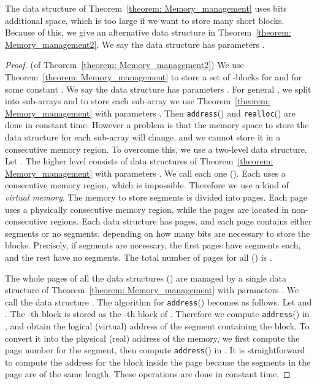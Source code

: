 \documentclass{llncs}
\begin{document}
The data structure of Theorem~\ref{theorem: Memory_management} uses
 bits additional space, which is too large if we want
to store many short blocks.
Because of this, we give an alternative data structure in
Theorem~\ref{theorem: Memory_management2}.
We say the data structure has parameters .

\begin{proof}  (of Theorem~\ref{theorem: Memory_management2})
We use Theorem~\ref{theorem: Memory_management} to store a set of -blocks
 for  and  for some constant .
We say the data structure has parameters .
For general , we split  into  sub-arrays
 and to store each sub-array 
we use Theorem~\ref{theorem: Memory_management} with parameters .
Then \texttt{address}() and \texttt{realloc}() are done in constant time.
However a problem is that the memory space to store the data structure 
for each sub-array will change, and we cannot store it in a consecutive memory region.
To overcome this, we use a two-level data structure.
Let .
The higher level consists of  data structures of 
Theorem~\ref{theorem: Memory_management} with parameters .
We call each one  
().  Each  uses a consecutive
memory region, which is impossible.  Therefore we use a kind of \emph{virtual memory}.
The memory to store segments is divided into pages.
Each page uses a physically consecutive memory region, while the pages are
located in non-consecutive regions.
Each data structure  has  pages, and each page contains either  segments
or no segments, depending on how many bits are necessary to store the blocks.
Precisely, if  segments are necessary, the first  pages
have  segments each, and the rest have no segments.
The total number of pages for all  () is 
.

The whole pages of all the data structures  ()
are managed by a single data structure of Theorem~\ref{theorem: Memory_management}
with parameters .
We call the data structure .  
The algorithm for \texttt{address}() becomes as follows.
Let  and .
The -th block is stored as the -th block of .
Therefore we compute \texttt{address}() in , and obtain the logical (virtual)
address  of the segment containing the block.
To convert it into the physical (real) address  of the memory,
we first compute the page number  for the segment, then compute
\texttt{address}() in .  It is straightforward to compute the address
for the block inside the page because the segments in the page are of
the same length.
These operations are done in constant time.


\end{proof}
\end{document}
